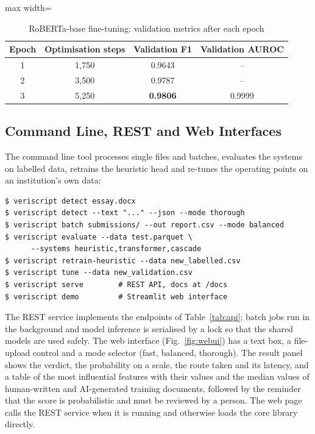 \begin{table}[H]
\caption{RoBERTa-base fine-tuning: validation metrics after each epoch}
\label{tab:finetune}
\centering
\small
\begin{adjustbox}{max width=\textwidth}\begin{tabular}{|c|c|c|c|}
\hline
\textbf{Epoch} & \textbf{Optimisation steps} & \textbf{Validation F1} & \textbf{Validation AUROC} \\ \hline
1 & 1,750 & 0.9643 & -- \\ \hline
2 & 3,500 & 0.9787 & -- \\ \hline
3 & 5,250 & \textbf{0.9806} & 0.9999 \\ \hline
\end{tabular}\end{adjustbox}
\end{table}

\subsection{Command Line, REST and Web Interfaces}

The command line tool processes single files and batches, evaluates the
systems on labelled data, retrains the heuristic head and re-tunes the
operating points on an institution's own data:

\begin{lstlisting}[language={},numbers=none,caption={Command line usage},label={lst:cli}]
$ veriscript detect essay.docx
$ veriscript detect --text "..." --json --mode thorough
$ veriscript batch submissions/ --out report.csv --mode balanced
$ veriscript evaluate --data test.parquet \
      --systems heuristic,transformer,cascade
$ veriscript retrain-heuristic --data new_labelled.csv
$ veriscript tune --data new_validation.csv
$ veriscript serve        # REST API, docs at /docs
$ veriscript demo         # Streamlit web interface
\end{lstlisting}

The REST service implements the endpoints of Table~\ref{tab:api}; batch jobs
run in the background and model inference is serialised by a lock so that the
shared models are used safely. The web interface (Fig.~\ref{fig:webui}) has a
text box, a file-upload control and a mode selector (fast, balanced,
thorough). The result panel shows the verdict, the probability on a scale, the
route taken and its latency, and a table of the most influential features with
their values and the median values of human-written and AI-generated training
documents, followed by the reminder that the score is probabilistic and must
be reviewed by a person. The web page calls the REST service when it is
running and otherwise loads the core library directly.

